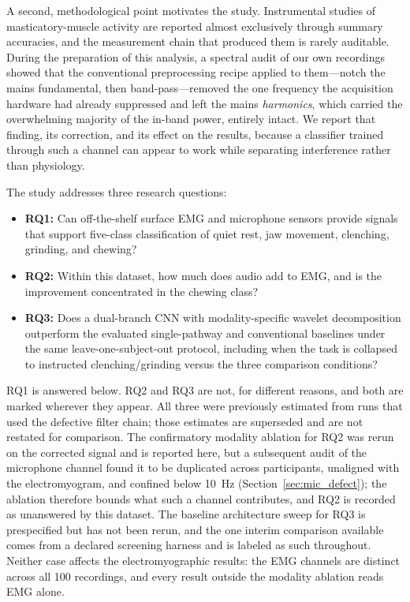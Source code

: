 \documentclass[pdflatex,sn-nature,iicol]{sn-jnl}
\begin{document}
A second, methodological point motivates the study. Instrumental studies of masticatory-muscle activity are reported almost exclusively through summary accuracies, and the measurement chain that produced them is rarely auditable. During the preparation of this analysis, a spectral audit of our own recordings showed that the conventional preprocessing recipe applied to them---notch the mains fundamental, then band-pass---removed the one frequency the acquisition hardware had already suppressed and left the mains \emph{harmonics}, which carried the overwhelming majority of the in-band power, entirely intact. We report that finding, its correction, and its effect on the results, because a classifier trained through such a channel can appear to work while separating interference rather than physiology.

The study addresses three research questions:

\begin{itemize}
    \item \textbf{RQ1:} Can off-the-shelf surface EMG and microphone sensors provide signals that support five-class classification of quiet rest, jaw movement, clenching, grinding, and chewing?
    \item \textbf{RQ2:} Within this dataset, how much does audio add to EMG, and is the improvement concentrated in the chewing class?
    \item \textbf{RQ3:} Does a dual-branch CNN with modality-specific wavelet decomposition outperform the evaluated single-pathway and conventional baselines under the same leave-one-subject-out protocol, including when the task is collapsed to instructed clenching/grinding versus the three comparison conditions?
\end{itemize}

RQ1 is answered below. RQ2 and RQ3 are not, for different reasons, and both are marked wherever they appear. All three were previously estimated from runs that used the defective filter chain; those estimates are superseded and are not restated for comparison. The confirmatory modality ablation for RQ2 was rerun on the corrected signal and is reported here, but a subsequent audit of the microphone channel found it to be duplicated across participants, unaligned with the electromyogram, and confined below 10~Hz (Section~\ref{sec:mic_defect}); the ablation therefore bounds what such a channel contributes, and RQ2 is recorded as unanswered by this dataset. The baseline architecture sweep for RQ3 is prespecified but has not been rerun, and the one interim comparison available comes from a declared screening harness and is labeled as such throughout. Neither case affects the electromyographic results: the EMG channels are distinct across all 100 recordings, and every result outside the modality ablation reads EMG alone.
\end{document}
